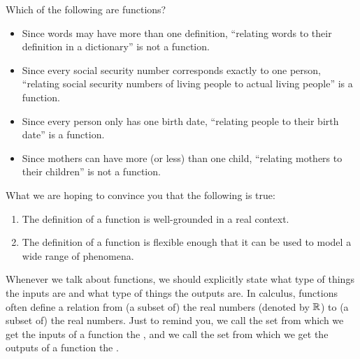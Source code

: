 \documentclass{ximera}
\begin{document}
\begin{question}
  Which of the following are functions?
  \begin{selectAll}
  \end{selectAll}
  \begin{feedback}\hfil
    \begin{itemize}
    \item Since words may have more than one definition, ``relating
      words to their definition in a dictionary'' is not a function.
    \item Since every social security number corresponds exactly to
      one person, ``relating social security numbers of living people
      to actual living people'' is a function.
    \item Since every person only has one birth date, ``relating
      people to their birth date'' is a function.
      \item Since mothers can have more (or less) than one child,
        ``relating mothers to their children'' is not a function.
    \end{itemize}
  \end{feedback}
\end{question}

What we are hoping to convince you that the following is true:
\begin{enumerate}
\item The definition of a function is well-grounded in a real context.
\item The definition of a function is flexible enough that it can be
  used to model a wide range of phenomena.
\end{enumerate}






Whenever we talk about functions, we should explicitly state
what type of things the inputs are and what type of things the outputs
are.  In calculus, functions often define a relation from (a subset
of) the real numbers (denoted by $\mathbb R$) to (a subset of) the real
numbers.  Just to remind you, we call the set from which we get the inputs
of a function the , and we call the set from which 
we get the outputs of a function the .
\end{document}
